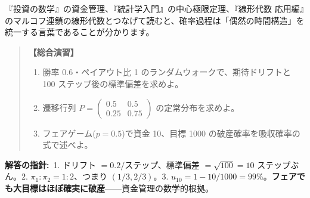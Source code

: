 \documentclass{article}
\begin{document}
『投資の数学』の資金管理、『統計学入門』の中心極限定理、『線形代数 応用編』のマルコフ連鎖の線形代数とつなげて読むと、確率過程は「偶然の時間構造」を統一する言葉であることが分かります。

\begin{quote}
\textbf{【総合演習】}
\begin{enumerate}
\item 勝率 0.6・ペイアウト比 1 のランダムウォークで、期待ドリフトと 100 ステップ後の標準偏差を求めよ。
\item 遷移行列 \(P = \begin{pmatrix} 0.5 & 0.5 \\ 0.25 & 0.75 \end{pmatrix}\) の定常分布を求めよ。
\item フェアゲーム(\(p = 0.5\))で資金 10、目標 1000 の破産確率を吸収確率の式で述べよ。
\end{enumerate}
\end{quote}

\textbf{解答の指針:}\ 1. ドリフト \(= 0.2/\)ステップ、標準偏差 \(= \sqrt{100} = 10\) ステップぶん。2. \(\pi_1 : \pi_2 = 1 : 2\)、つまり \((1/3, 2/3)\)。3. \(u_{10} = 1 - 10/1000 = 99\%\)。\textbf{フェアでも大目標はほぼ確実に破産}——資金管理の数学的根拠。
\end{document}
